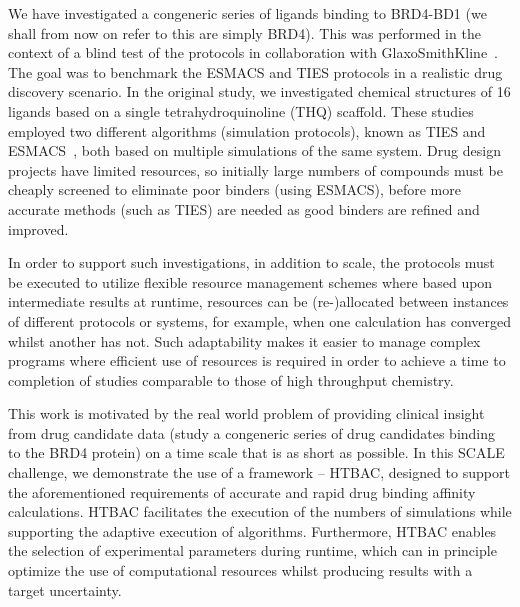 \documentclass[conference]{IEEEtran}
\begin{document}
We have investigated a congeneric series of ligands binding to BRD4-BD1 (we shall
from now on refer to this are simply BRD4). This was performed in the context
of a blind test of the protocols in collaboration with
GlaxoSmithKline~\cite{Wan2017brd4}. The goal was to benchmark the ESMACS and
TIES protocols in a realistic drug discovery scenario. In the original study,
we investigated chemical structures of 16 ligands based on a single
tetrahydroquinoline (THQ) scaffold. These studies employed two different
algorithms (simulation protocols), known as TIES and ESMACS~\cite{Bhati2017},
both based on multiple simulations of the same system. Drug design projects
have limited resources, so initially large numbers of compounds must be
cheaply screened to eliminate poor binders (using ESMACS), before more
accurate methods (such as TIES) are needed as good binders are refined and
improved.

In order to support such investigations, in addition to scale, the protocols
must be executed to utilize  flexible resource management schemes where based
upon intermediate results at runtime, resources can be (re-)allocated between
instances of different protocols or systems, for example, when one calculation
has converged whilst another has not. Such adaptability makes it easier to
manage complex programs where efficient use of resources is required in order
to achieve a time to completion of studies comparable to those of high
throughput chemistry.

This work is motivated by the real world problem of providing clinical insight
from drug candidate data (study a congeneric series of drug candidates binding
to the BRD4 protein) on a time scale that is as short as possible. In this
SCALE challenge, we demonstrate the use of a framework -- HTBAC, designed to
support the aforementioned requirements of accurate and rapid drug binding
affinity calculations. HTBAC facilitates the execution of the numbers of
simulations while supporting the adaptive execution of algorithms.
Furthermore, HTBAC enables the selection of experimental parameters during
runtime, which can in principle optimize the use of computational resources
whilst producing results with a target uncertainty.


\end{document}
